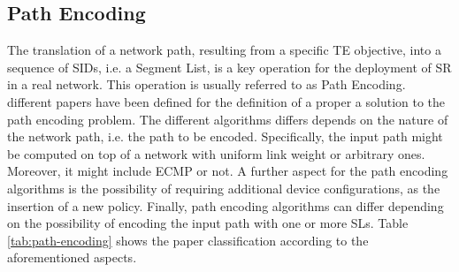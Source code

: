 \subsection{Path Encoding}
\label{sec:path}

The translation of a network path, resulting from a specific TE objective, into a sequence of SIDs, i.e. a Segment List, is a key operation for the deployment of SR in a real network. This operation is usually referred to as Path Encoding.
\PathencPapers different papers have been defined for the definition of a proper a solution to the path encoding problem.
The different algorithms differs depends on the nature of the network path, i.e. the path to be encoded.
Specifically, the input path might be computed on top of a network with uniform link weight or arbitrary ones.
Moreover, it might include ECMP or not.
A further aspect for the path encoding algorithms is the possibility of requiring additional device configurations, as the insertion of a new policy.
Finally, path encoding algorithms can differ depending on the possibility of encoding the input path with one or more SLs.
Table \ref{tab:path-encoding} shows the paper classification according to the aforementioned aspects.

